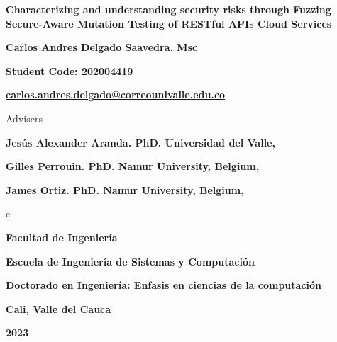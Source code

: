 
\begin{titlepage}
\begin{comment}

		\begin{center}
			{\bf Characterizing and understanding security risks through Fuzzing Secure-Aware Mutation Testing of RESTful-API Cloud Services}
			\vfill
			{\bf Carlos Andres Delgado Saavedra. Msc \par}
			{\bf Código: 2004419 \par}
			{\bf carlos.andres.delgado@correounivalle.edu.co }
			\vfill
			{\bf Facultad de Ingeniería \par}
			{\bf Escuela de Ingeniería de Sistemas y Computación \par}
			{\bf Doctorado en Ingeniería: Enfasis en ciencias de la computación\par}
			{\bf Cali, Valle del Cauca \par}
			{\bf 2023 \par}
    \end{center}
\newpage
\end{comment}
	\begin{center}
			{\bf Characterizing and understanding security risks through Fuzzing Secure-Aware Mutation Testing of RESTful APIs Cloud Services}
			\vfill
			{\bf Carlos Andres Delgado Saavedra. Msc \par}
			{\bf Student Code: 202004419 \par}
			{\bf \href{mailto:carlos.andres.delgado@correounivalle.edu.co}{carlos.andres.delgado@correounivalle.edu.co }}
			\vfill

		{Advisers \par}
		{\bf Jesús Alexander Aranda. PhD. Universidad del Valle, \par}
		{\bf Gilles Perrouin. PhD. Namur University, Belgium, \par}
         {\bf James Ortiz. PhD. Namur University, Belgium, \par}
			\vfill e
			{\bf Facultad de Ingeniería \par}
			{\bf Escuela de Ingeniería de Sistemas y Computación \par}
			{\bf Doctorado en Ingeniería: Enfasis en ciencias de la computación\par}
			{\bf Cali, Valle del Cauca \par}
			{\bf 2023 \par}
    \end{center}
\end{titlepage} 

